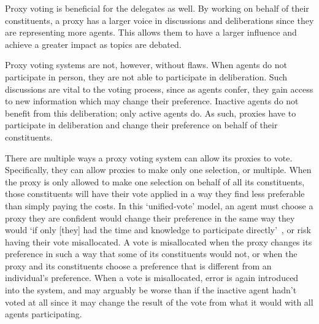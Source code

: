 Proxy voting is beneficial for the delegates as well.
By working on behalf of their constituents, a proxy has a larger voice in discussions
and deliberations since they are representing more agents.
This allows them to have a larger influence and achieve a greater impact as topics
are debated.

Proxy voting systems are not, however, without flaws.
When agents do not participate in person, they are not able to participate in
deliberation.
Such discussions are vital to the voting process, since as agents confer, they gain
access to new information which may change their preference.
Inactive agents do not benefit from this deliberation; only active agents do.
As such, proxies have to participate in deliberation and change their preference on
behalf of their constituents.

There are multiple ways a proxy voting system can allow its proxies to
vote.
Specifically, they can allow proxies to make only one selection, or multiple.
When the proxy is only allowed to make one selection on behalf of all its
constituents, those constituents will have their vote applied in a way they find less
preferable than simply paying the costs.
In this `unified-vote' model, an agent must choose a proxy they are confident would
change their preference in the same way they would `if only [they] had the time and
knowledge to participate directly'~\cite{Miller1969}, or risk having their vote
misallocated.
A vote is misallocated when the proxy changes its preference in such a way that
some of its constituents would not, or when the proxy and its constituents choose a
preference that is different from an individual's preference.
When a vote is misallocated, error is again introduced into the system, and may
arguably be worse than if the inactive agent hadn't voted at all since it may change
the result of the vote from what it would with all agents participating.

